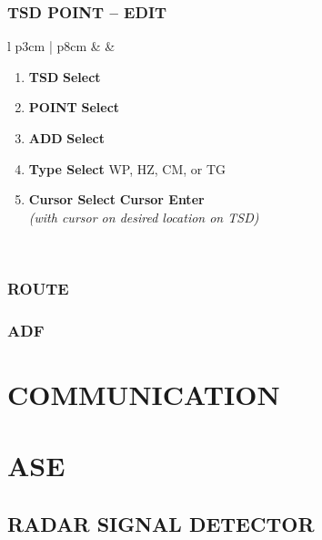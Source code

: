 \documentclass[fontHelvetica]{TechCheck}
\begin{document}
	\subsection{TSD POINT -- EDIT}
	\begin{center}
		\begin{longtable}{l p{3cm} | p{8cm}}
			\toprule
			\textbf{\textbullet} &  &
			\begin{minipage}[t]{\linewidth}
				\vspace{-7pt}
				\begin{enumerate}
					\item \textbf{TSD} \dotfill \textbf{Select}
					\item \textbf{POINT} \dotfill \textbf{Select}
					\item \textbf{ADD} \dotfill \textbf{Select}
					\item \textbf{Type Select} \dotfill WP, HZ, CM, or TG 
					\item \textbf{Cursor Select} \dotfill \textbf{Cursor Enter} \\
					\hfill \emph{(with cursor on desired location on TSD)}
				\end{enumerate}
			\end{minipage} \\
			\bottomrule
		\end{longtable}
	\end{center}

	
	
	\subsection{ROUTE}

	\subsection{ADF}

	\cleardoublepage

	\chapter{COMMUNICATION}
	\minitoc
	\cleardoublepage

	\chapter{ASE}
	\minitoc
	\cleardoublepage

	
	\section{RADAR SIGNAL DETECTOR}
\end{document}
